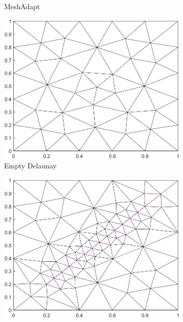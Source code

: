 \begin{figure}[ht]
\begin{subfigure}[b]{0.33\textwidth}
        \caption{MeshAdapt}
        \label{fig:Gmsh-MeshAdapt}
    \end{subfigure}
    \begin{subfigure}[b]{0.33\textwidth}
        \centering
        \includegraphics[width=\textwidth]{report/Images/Software/Gmsh meshing algorithms/gmsh_meshing_algorithms_delaunay.png}
        \caption{Empty Delaunay}
        \label{fig:Gmsh-Delaunay-empty}
    \end{subfigure}
    \begin{subfigure}[b]{0.33\textwidth}
        \centering
        \includegraphics[width=\textwidth]{report/Images/Software/Gmsh meshing algorithms/gmsh_meshing_algorithms_embedded_delaunay.png}

\end{subfigure}
\end{figure}
